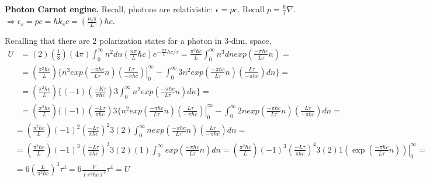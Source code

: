 \documentclass[twoside]{amsart}
\theoremstyle{plain}
\theoremstyle{definition}
\newcommand{\solutionhead}[1]
  {
   \noindent{\small\bf Solution #1.}
   }
\begin{document}
\solutionhead{3} \textbf{Photon Carnot engine.} Recall, photons are relativistic: $\epsilon  = pc$.  Recall $ p = \frac{ \hbar }{ i} \nabla$.  $ \Longrightarrow \epsilon_s = pc = \hbar k_s c = \left( \frac{ n_s \pi }{L} \right) \hbar c$.  

Recalling that there are 2 polarization states for a photon in 3-dim. space,
\[
\begin{aligned}
  U & = (2) \left( \frac{1}{8} \right) (4\pi ) \int_0^{\infty} n^2 dn \left( \frac{n \pi }{L} \hbar c \right) e^{ - \frac{ n \pi}{L} \hbar c /\tau } = \frac{\pi^2 \hbar c }{L } \int_0^{\infty} n^3 dn exp{ \left( \frac{- \pi \hbar c}{ L \tau} n \right) } = \\
& = \left( \frac{ \pi^2 \hbar c}{L} \right) \lbrace \left. n^3 exp{ \left( \frac{ - \pi \hbar c}{ L \tau } n \right) } \left( \frac{ L \tau }{ -\pi \hbar c} \right) \right|_0^{\infty} - \int_0^{\infty} 3n^2 exp{ \left( \frac{ - \pi \hbar c}{ L \tau } n \right) } \left( \frac{ L \tau }{ -\pi \hbar c} \right) dn \rbrace = \\
  & = \left( \frac{\pi^2 \hbar c}{L} \right) \lbrace (-1) \left( \frac{ - K \tau}{\pi \hbar c} \right) 3 \int_0^{\infty} n^2 exp{ \left( \frac{ - \pi \hbar c}{ L \tau } n \right) } dn \rbrace = \\
  & = \left( \frac{ \pi^2  \hbar c}{L} \right) \lbrace (-1) \left( \frac{-L \tau}{\pi \hbar c} \right)3 \lbrace \left. n^2 exp{ \left( \frac{ - \pi \hbar c}{ L \tau } n \right) } \left( \frac{ L \tau }{ -\pi \hbar c} \right) \right|_0^{\infty} - \int_0^{\infty} 2n exp{ \left( \frac{ - \pi \hbar c}{ L \tau } n \right) } \left( \frac{ L \tau }{ -\pi \hbar c} \right) dn = 
\end{aligned} 
\]
\[
\begin{aligned} 
 & = \left( \frac{ \pi^2 \hbar c}{L} \right) (-1)^2 \left( \frac{ - L \tau}{ \pi \hbar c } \right)^2 3 (2) \int_0^{\infty} n exp{ \left( \frac{ - \pi \hbar c}{ L \tau } n \right) } \left( \frac{ L \tau }{ -\pi \hbar c} \right) dn = \\
  & = \left( \frac{\pi^2 \hbar c}{L} \right)(-1)^3 \left( \frac{ -L \tau}{\pi \hbar c} \right)^3 3(2)(1) \int_0^{\infty } exp{ \left( \frac{ - \pi \hbar c}{ L \tau } n \right) } dn = \left( \frac{\pi^2 \hbar c}{L} \right)(-1)^3 \left( \frac{-L \tau}{\pi \hbar c} \right)^4 3(2)1 \left. \left( \exp{ \left( \frac{-\pi \hbar c}{ L \tau} n \right) } \right) \right|_0^{\infty} = \\
  & = 6 \left( \frac{ L }{ \pi^2 \hbar c } \right)^3 \tau^4 = \boxed{ 6 \frac{ V}{ (\pi^2 \hbar c )^3} \tau^4  = U }
\end{aligned}
\]
\end{document}
